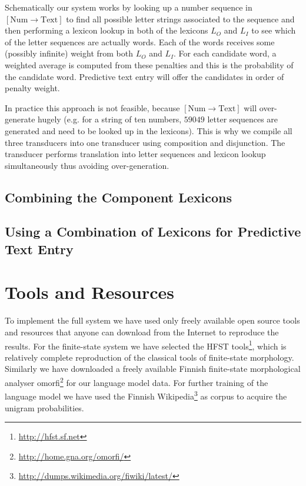 \documentclass[a4paper,conference]{IEEEtran}
\begin{document}
Schematically our system works by looking up a number sequence in
$[\mathrm{Num}\rightarrow\mathrm{Text}]$ to find all possible letter
strings associated to the sequence and then performing a lexicon
lookup in both of the lexicons $L_O$ and $L_I$ to see which of the
letter sequences are actually words. Each of the words receives some
(possibly infinite) weight from both $L_O$ and $L_I$. For each
candidate word, a weighted average is computed from these penalties
and this is the probability of the candidate word. Predictive text
entry will offer the candidates in order of penalty weight.

In practice this approach is not feasible, because
$[\mathrm{Num}\rightarrow\mathrm{Text}]$ will over-generate hugely
(e.g. for a string of ten numbers, $59049$ letter sequences are
generated and need to be looked up in the lexicons). This is why we
compile all three transducers into one transducer using composition
and disjunction. The transducer performs translation into letter
sequences and lexicon lookup simultaneously thus avoiding
over-generation.

\subsection{Combining the Component Lexicons}


\subsection{Using a Combination of Lexicons for Predictive Text Entry}

\section{Tools and Resources}
\label{sec:tools}

To implement the full system we have used only freely available open source
tools and resources that anyone can download from the Internet to reproduce the
results. For the finite-state system we have selected the HFST
tools\footnote{\url{http://hfst.sf.net}}, which is relatively complete
reproduction of the classical tools of finite-state
morphology\cite{beesley/2003}. Similarly we have downloaded a freely available
Finnish finite-state morphological analyser
omorfi\footnote{\url{http://home.gna.org/omorfi/}} for our language model
data\cite{pirinen/2011/nodalida}. For further training of the language model we
have used the Finnish
Wikipedia\footnote{\url{http://dumps.wikimedia.org/fiwiki/latest/}} as corpus
to acquire the unigram probabilities\cite{pirinen/2010/lrec}.
\end{document}
